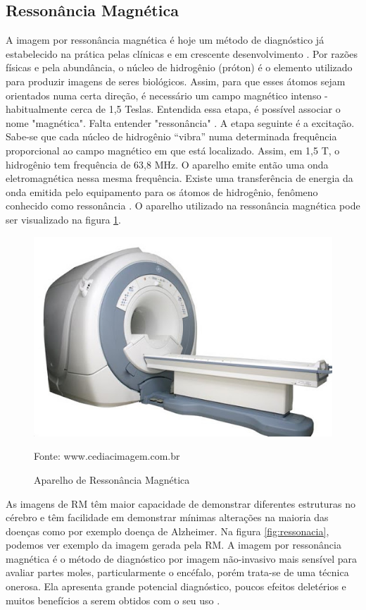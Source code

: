 \documentclass[openright]{UFRGS} %
\begin{document}
\subsection{Ressonância Magnética}
A imagem por ressonância magnética é hoje um método de diagnóstico já estabelecido na prática  pelas clínicas e em crescente desenvolvimento . Por razões físicas e pela abundância, o núcleo de hidrogênio (próton) é o elemento utilizado para produzir imagens de seres biológicos. Assim, para que esses átomos sejam orientados numa certa direção, é necessário um campo magnético intenso - habitualmente cerca de 1,5 Teslas. Entendida essa etapa, é possível associar o nome "magnética". Falta entender "ressonância" \cite{hage2009imagem}. A etapa seguinte é a excitação. Sabe-se que cada núcleo de
hidrogênio “vibra” numa determinada frequência proporcional
ao campo magnético em que está localizado. Assim, em 1,5 T, o hidrogênio tem frequência de 63,8 MHz. O aparelho emite então uma onda eletromagnética nessa mesma frequência. Existe uma transferência de energia da onda emitida pelo equipamento para os átomos de hidrogênio, fenômeno conhecido como ressonância \cite{hage2009imagem}. O aparelho utilizado na  ressonância magnética  pode ser visualizado na figura \ref{fig:ressonaciaAparelho}.

\begin{figure}[h]
    \centering
    \caption{Aparelho de Ressonância Magnética}
    \includegraphics[scale=0.35]{figuras/ressonaciamagnetica.jpg}
    \centerline{Fonte: www.cediacimagem.com.br}
    \label{fig:ressonaciaAparelho}
\end{figure}


As imagens de RM têm maior capacidade de demonstrar diferentes estruturas no cérebro e têm facilidade em demonstrar mínimas alterações na maioria das doenças como por exemplo doença de Alzheimer. Na figura \ref{fig:ressonacia}, podemos ver exemplo da imagem gerada pela RM. A imagem por ressonância magnética é o método de diagnóstico por imagem não-invasivo mais sensível para avaliar partes moles, particularmente o encéfalo, porém trata-se de uma técnica onerosa. Ela apresenta grande potencial diagnóstico, poucos efeitos deletérios e muitos benefícios a serem obtidos com o seu uso \cite{mazzola2009ressonancia}.
\end{document}
